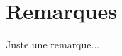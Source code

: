 \section{Remarques}

\begin{doclatex}
    \begin{remark}
        Juste une remarque...
    \end{remark}
\end{doclatex}
